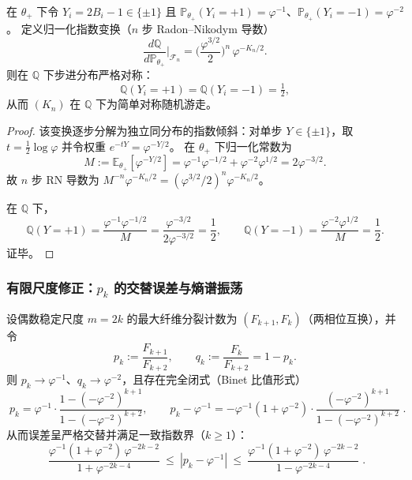 \begin{proposition}\label{prop:pom-golden-esscher-symmetrization}
在 \(\theta_+\) 下令 \(Y_i=2B_i-1\in\{\pm 1\}\) 且 \(\mathbb{P}_{\theta_+}(Y_i=+1)=\varphi^{-1}\)、\(\mathbb{P}_{\theta_+}(Y_i=-1)=\varphi^{-2}\)。
定义归一化指数变换（\(n\) 步 Radon--Nikodym 导数）
\[
\boxed{\;
\frac{d\mathbb{Q}}{d\mathbb{P}_{\theta_+}}\Big|_{\mathcal{F}_n}
=\Big(\frac{\varphi^{3/2}}{2}\Big)^{n}\,\varphi^{-K_n/2}.\;}
\]
则在 \(\mathbb{Q}\) 下步进分布严格对称：
\[
\boxed{\;\mathbb{Q}(Y_i=+1)=\mathbb{Q}(Y_i=-1)=\tfrac12,\;}
\]
从而 \((K_n)\) 在 \(\mathbb{Q}\) 下为简单对称随机游走。
\end{proposition}

\begin{proof}
该变换逐步分解为独立同分布的指数倾斜：对单步 \(Y\in\{\pm 1\}\)，取
\(
t=\tfrac12\log\varphi
\)
并令权重 \(e^{-tY}=\varphi^{-Y/2}\)。
在 \(\theta_+\) 下归一化常数为
\[
M:=\mathbb{E}_{\theta_+}[\varphi^{-Y/2}]
=\varphi^{-1}\varphi^{-1/2}+\varphi^{-2}\varphi^{1/2}
=2\varphi^{-3/2}.
\]
故 \(n\) 步 RN 导数为 \(M^{-n}\varphi^{-K_n/2}=(\varphi^{3/2}/2)^n\varphi^{-K_n/2}\)。
\par
在 \(\mathbb{Q}\) 下，
\[
\mathbb{Q}(Y=+1)=\frac{\varphi^{-1}\varphi^{-1/2}}{M}
=\frac{\varphi^{-3/2}}{2\varphi^{-3/2}}=\frac12,
\qquad
\mathbb{Q}(Y=-1)=\frac{\varphi^{-2}\varphi^{1/2}}{M}=\frac12.
\]
证毕。
\end{proof}

\subsubsection{有限尺度修正：\texorpdfstring{$p_k$}{p_k} 的交替误差与熵谱振荡}

\begin{proposition}\label{prop:pom-max-fiber-split-ratio-finite-scale}
设偶数稳定尺度 \(m=2k\) 的最大纤维分裂计数为 \((F_{k+1},F_k)\)（两相位互换），并令
\[
p_k:=\frac{F_{k+1}}{F_{k+2}},\qquad q_k:=\frac{F_k}{F_{k+2}}=1-p_k.
\]
则 \(p_k\to\varphi^{-1}\)、\(q_k\to\varphi^{-2}\)，且存在完全闭式（Binet 比值形式）
\[
\boxed{\;
p_k=\varphi^{-1}\cdot\frac{1-(-\varphi^{-2})^{k+1}}{1-(-\varphi^{-2})^{k+2}},\qquad
p_k-\varphi^{-1}
=-\varphi^{-1}(1+\varphi^{-2})\cdot
\frac{(-\varphi^{-2})^{k+1}}{1-(-\varphi^{-2})^{k+2}}\; }.
\]
从而误差呈严格交替并满足一致指数界（\(k\ge 1\)）：
\[
\boxed{\;
\frac{\varphi^{-1}(1+\varphi^{-2})\,\varphi^{-2k-2}}{1+\varphi^{-2k-4}}
\ \le\
|p_k-\varphi^{-1}|
\ \le\
\frac{\varphi^{-1}(1+\varphi^{-2})\,\varphi^{-2k-2}}{1-\varphi^{-2k-4}}\; }.
\]
\end{proposition}

